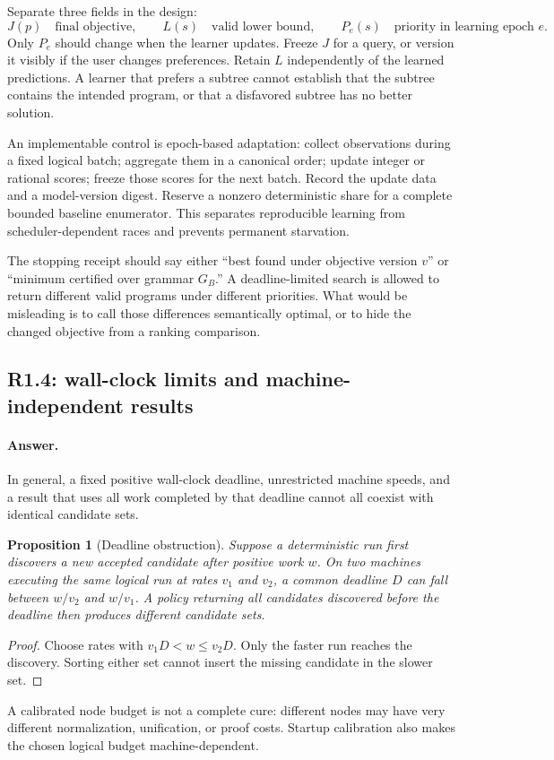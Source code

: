 \documentclass[11pt,a4paper]{article}
\newcommand{\answer}{\paragraph{Answer.}}
\newtheorem{proposition}{Proposition}[section]
\theoremstyle{definition}
\theoremstyle{remark}
\begin{document}
Separate three fields in the design:
\[
  J(p)\quad\text{final objective},\qquad
  L(s)\quad\text{valid lower bound},\qquad
  P_e(s)\quad\text{priority in learning epoch }e.
\]
Only $P_e$ should change when the learner updates. Freeze $J$ for a query, or
version it visibly if the user changes preferences. Retain $L$ independently of
the learned predictions. A learner that prefers a subtree cannot establish that
the subtree contains the intended program, or that a disfavored subtree has no
better solution.

An implementable control is epoch-based adaptation: collect observations during
a fixed logical batch; aggregate them in a canonical order; update integer or
rational scores; freeze those scores for the next batch. Record the update data
and a model-version digest. Reserve a nonzero deterministic share for a complete
bounded baseline enumerator. This separates reproducible learning from
scheduler-dependent races and prevents permanent starvation.

The stopping receipt should say either ``best found under objective version
$v$'' or ``minimum certified over grammar $G_B$.'' A deadline-limited search is
allowed to return different valid programs under different priorities. What
would be misleading is to call those differences semantically optimal, or to
hide the changed objective from a ranking comparison.

\subsection{R1.4: wall-clock limits and machine-independent results}
\answer In general, a fixed positive wall-clock deadline, unrestricted machine
speeds, and a result that uses all work completed by that deadline cannot all
coexist with identical candidate sets.

\begin{proposition}[Deadline obstruction]\label{prop:deadline}
Suppose a deterministic run first discovers a new accepted candidate after
positive work $w$. On two machines executing the same logical run at rates
$v_1$ and $v_2$, a common deadline $D$ can fall between $w/v_2$ and $w/v_1$.
A policy returning all candidates discovered before the deadline then produces
different candidate sets.
\end{proposition}
\begin{proof}
Choose rates with $v_1D<w\leq v_2D$. Only the faster run reaches the discovery.
Sorting either set cannot insert the missing candidate in the slower set.
\end{proof}
A calibrated node budget is not a complete cure: different nodes may have very
different normalization, unification, or proof costs. Startup calibration also
makes the chosen logical budget machine-dependent.
\end{document}
